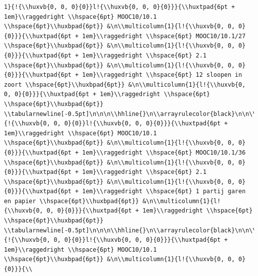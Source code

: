 \documentclass[11pt,preprint, authoryear]{elsarticle}
\numberwithin{equation}{section}
\numberwithin{figure}{section}
\numberwithin{table}{section}
\begin{document}
\begin{verbatim}
1}{!{\\huxvb{0, 0, 0}{0}}l!{\\huxvb{0, 0, 0}{0}}}{\\huxtpad{6pt + 1em}\\raggedright \\hspace{6pt} MOOC10/10.1 \\hspace{6pt}\\huxbpad{6pt}} &\n\\multicolumn{1}{l!{\\huxvb{0, 0, 0}{0}}}{\\huxtpad{6pt + 1em}\\raggedright \\hspace{6pt} MOOC10/10.1/27 \\hspace{6pt}\\huxbpad{6pt}} &\n\\multicolumn{1}{l!{\\huxvb{0, 0, 0}{0}}}{\\huxtpad{6pt + 1em}\\raggedright \\hspace{6pt} 2.1 \\hspace{6pt}\\huxbpad{6pt}} &\n\\multicolumn{1}{l!{\\huxvb{0, 0, 0}{0}}}{\\huxtpad{6pt + 1em}\\raggedright \\hspace{6pt} 12 sloopen in zoort \\hspace{6pt}\\huxbpad{6pt}} &\n\\multicolumn{1}{l!{\\huxvb{0, 0, 0}{0}}}{\\huxtpad{6pt + 1em}\\raggedright \\hspace{6pt}  \\hspace{6pt}\\huxbpad{6pt}} \\tabularnewline[-0.5pt]\n\n\n\\hhline{}\n\\arrayrulecolor{black}\n\n\\multicolumn{1}{!{\\huxvb{0, 0, 0}{0}}l!{\\huxvb{0, 0, 0}{0}}}{\\huxtpad{6pt + 1em}\\raggedright \\hspace{6pt} MOOC10/10.1 \\hspace{6pt}\\huxbpad{6pt}} &\n\\multicolumn{1}{l!{\\huxvb{0, 0, 0}{0}}}{\\huxtpad{6pt + 1em}\\raggedright \\hspace{6pt} MOOC10/10.1/36 \\hspace{6pt}\\huxbpad{6pt}} &\n\\multicolumn{1}{l!{\\huxvb{0, 0, 0}{0}}}{\\huxtpad{6pt + 1em}\\raggedright \\hspace{6pt} 2.1 \\hspace{6pt}\\huxbpad{6pt}} &\n\\multicolumn{1}{l!{\\huxvb{0, 0, 0}{0}}}{\\huxtpad{6pt + 1em}\\raggedright \\hspace{6pt} 1 partij garen en papier \\hspace{6pt}\\huxbpad{6pt}} &\n\\multicolumn{1}{l!{\\huxvb{0, 0, 0}{0}}}{\\huxtpad{6pt + 1em}\\raggedright \\hspace{6pt}  \\hspace{6pt}\\huxbpad{6pt}} \\tabularnewline[-0.5pt]\n\n\n\\hhline{}\n\\arrayrulecolor{black}\n\n\\multicolumn{1}{!{\\huxvb{0, 0, 0}{0}}l!{\\huxvb{0, 0, 0}{0}}}{\\huxtpad{6pt + 1em}\\raggedright \\hspace{6pt} MOOC10/10.1 \\hspace{6pt}\\huxbpad{6pt}} &\n\\multicolumn{1}{l!{\\huxvb{0, 0, 0}{0}}}{\\
\end{verbatim}
\end{document}
